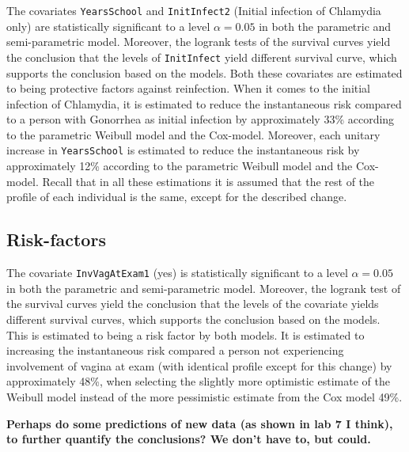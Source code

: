 \documentclass[
]{article}
\begin{document}
The covariates \texttt{YearsSchool} and \texttt{InitInfect2} (Initial infection of Chlamydia only) are statistically significant to a level \(\alpha = 0.05\) in both the parametric and semi-parametric model. Moreover, the logrank tests of the survival curves yield the conclusion that the levels of \texttt{InitInfect} yield different survival curve, which supports the conclusion based on the models. Both these covariates are estimated to being protective factors against reinfection. When it comes to the initial infection of Chlamydia, it is estimated to reduce the instantaneous risk compared to a person with Gonorrhea as initial infection by approximately 33\% according to the parametric Weibull model and the Cox-model. Moreover, each unitary increase in \texttt{YearsSchool} is estimated to reduce the instantaneous risk by approximately 12\% according to the parametric Weibull model and the Cox-model. Recall that in all these estimations it is assumed that the rest of the profile of each individual is the same, except for the described change.

\hypertarget{risk-factors}{%
\subsection{Risk-factors}\label{risk-factors}}

The covariate \texttt{InvVagAtExam1} (yes) is statistically significant to a level \(\alpha = 0.05\) in both the parametric and semi-parametric model. Moreover, the logrank test of the survival curves yield the conclusion that the levels of the covariate yields different survival curves, which supports the conclusion based on the models. This is estimated to being a risk factor by both models. It is estimated to increasing the instantaneous risk compared a person not experiencing involvement of vagina at exam (with identical profile except for this change) by approximately 48\%, when selecting the slightly more optimistic estimate of the Weibull model instead of the more pessimistic estimate from the Cox model 49\%.

\textbf{Perhaps do some predictions of new data (as shown in lab 7 I think), to further quantify the conclusions? We don't have to, but could.}
\end{document}
